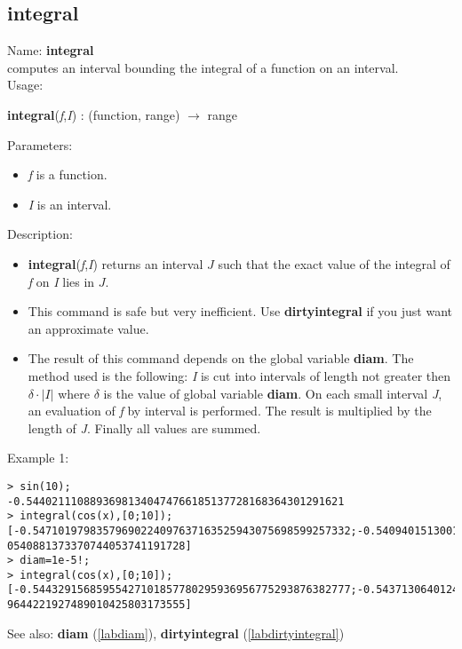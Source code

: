 \subsection{integral}
\label{labintegral}
\noindent Name: \textbf{integral}\\
computes an interval bounding the integral of a function on an interval.\\
\noindent Usage: 
\begin{center}
\textbf{integral}(\emph{f},\emph{I}) : (\textsf{function}, \textsf{range}) $\rightarrow$ \textsf{range}\\
\end{center}
Parameters: 
\begin{itemize}
\item \emph{f} is a function.
\item \emph{I} is an interval.
\end{itemize}
\noindent Description: \begin{itemize}

\item \textbf{integral}(\emph{f},\emph{I}) returns an interval $J$ such that the exact value of 
   the integral of \emph{f} on \emph{I} lies in $J$.

\item This command is safe but very inefficient. Use \textbf{dirtyintegral} if you just want
   an approximate value.

\item The result of this command depends on the global variable \textbf{diam}.
   The method used is the following: \emph{I} is cut into intervals of length not 
   greater then $\delta \cdot |I|$ where $\delta$ is the value
   of global variable \textbf{diam}.
   On each small interval \emph{J}, an evaluation of \emph{f} by interval is
   performed. The result is multiplied by the length of \emph{J}. Finally all values 
   are summed.
\end{itemize}
\noindent Example 1: 
\begin{center}\begin{minipage}{15cm}\begin{Verbatim}[frame=single]
> sin(10);
-0.54402111088936981340474766185137728168364301291621
> integral(cos(x),[0;10]);
[-0.54710197983579690224097637163525943075698599257332;-0.5409401513001318384815
0540881373370744053741191728]
> diam=1e-5!;
> integral(cos(x),[0;10]);
[-0.54432915685955427101857780295936956775293876382777;-0.5437130640124996950803
9644221927489010425803173555]
\end{Verbatim}
\end{minipage}\end{center}
See also: \textbf{diam} (\ref{labdiam}), \textbf{dirtyintegral} (\ref{labdirtyintegral})
